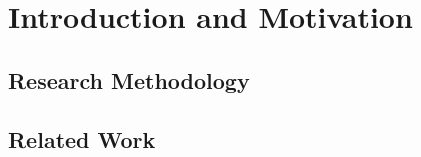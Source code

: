 \documentclass[language=english,noinputenc]{wiwwuwordrprt}
\begin{document}

  \tableofcontents



  \clearpage


  \chapter{Introduction and Motivation} %
  \label{cha:introduction_and_motivation}

    \section{Research Methodology} %
    \label{sec:research_methodology}
    

    \section{Related Work} %
    \label{sec:related_work}
    
\end{document}

